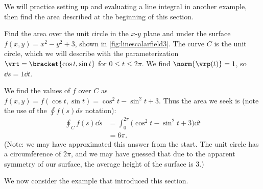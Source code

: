 We will practice setting up and evaluating a line integral in another example, then find the area described at the beginning of this section.

\begin{example}\label{ex_linescalarfield3}
Find
%
%
the area over the unit circle in the $x$-$y$ plane and under the surface $f(x,y) = x^2-y^2+3$, shown in \autoref{fig:linescalarfield3}.
\solution
The curve $C$ is the unit circle, which we will describe with the parameterization $\vrt =\bracket{\cos t,\sin t}$ for $0\leq t\leq 2\pi$. We find $\norm{\vrp(t)} = 1$, so $\dd s = 1 \dd t$.  

We find the values of $f$ over $C$ as $f(x,y) = f(\cos t, \sin t) = \cos^2t-\sin^2t+3$. Thus the area we seek is (note the use of the $\oint f(s) ds$ notation):
\begin{align*}
	\oint_C f(s)\dd s
	&= \int_0^{2\pi}\bigl(\cos^2t-\sin^2t+3\bigr)\dd t \\
	&= 6\pi.
\end{align*}
(Note: we may have approximated this answer from the start. The unit circle has a circumference of $2\pi$, and we may have guessed that due to the apparent symmetry of our surface, the average height of the surface is 3.)
\end{example}

We now consider the example that introduced this section.


